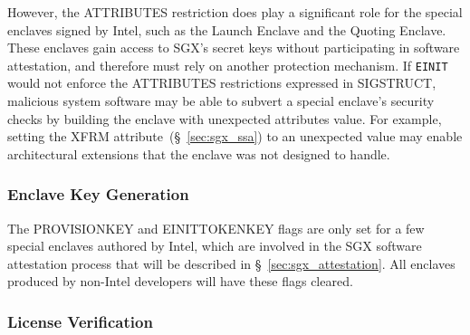 
However, the ATTRIBUTES restriction does play a significant role for the
special enclaves signed by Intel, such as the Launch Enclave and the Quoting
Enclave. These enclaves gain access to SGX's secret keys without participating
in software attestation, and therefore must rely on another protection
mechanism. If \texttt{EINIT} would not enforce the ATTRIBUTES restrictions
expressed in SIGSTRUCT, malicious system software may be able to subvert a
special enclave's security checks by building the enclave with unexpected
attributes value. For example, setting the XFRM
attribute~(\S~\ref{sec:sgx_ssa}) to an unexpected value may enable
architectural extensions that the enclave was not designed to handle.


\subsubsection{Enclave Key Generation}
\label{sec:sgx_egetkey}






The PROVISIONKEY and EINITTOKENKEY flags are only set for a few special
enclaves authored by Intel, which are involved in the SGX software attestation
process that will be described in \S~\ref{sec:sgx_attestation}. All enclaves
produced by non-Intel developers will have these flags cleared.



\subsubsection{License Verification}
\label{sec:sgx_launch_enclave}


